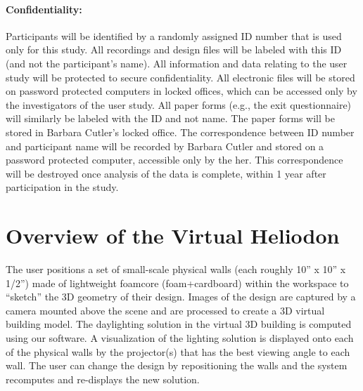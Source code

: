 \documentclass[10pt]{article}
\begin{document}
\paragraph{Confidentiality:}
Participants will be identified by a randomly assigned ID number that
is used only for this study.  All recordings and design files will be
labeled with this ID (and not the participant's name).  All
information and data relating to the user study will be protected to
secure confidentiality.  All electronic files will be stored on
password protected computers in locked offices, which can be accessed
only by the investigators of the user study.  All paper forms (e.g.,
the exit questionnaire) will similarly be labeled with the ID and not
name.  The paper forms will be stored in Barbara Cutler's locked
office.  The correspondence between ID number and participant name
will be recorded by Barbara Cutler and stored on a password protected
computer, accessible only by the her.  This correspondence will be
destroyed once analysis of the data is complete, within 1 year after
participation in the study.

\newpage

\section{Overview of the Virtual Heliodon}

\noindent
The user positions a set of small-scale physical walls (each roughly
10'' x 10'' x 1/2'') made of lightweight foamcore (foam+cardboard)
within the workspace to ``sketch'' the 3D geometry of their design.
Images of the design are captured by a camera mounted above the scene
and are processed to create a 3D virtual building model.  The
daylighting solution in the virtual 3D building is computed using our
software.  A visualization of the lighting solution is displayed onto
each of the physical walls by the projector(s) that has the best
viewing angle to each wall.  The user can change the design by
repositioning the walls and the system recomputes and re-displays the
new solution.
\end{document}
